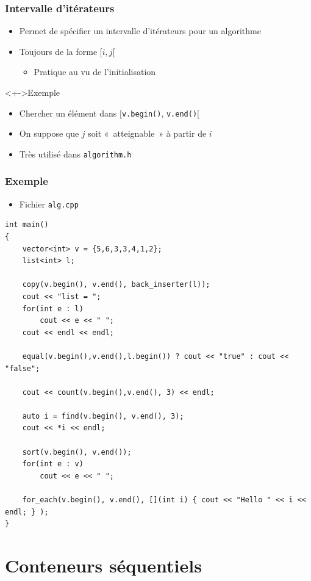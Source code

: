 \begin{frame}
\frametitle{Intervalle d'itérateurs}
\begin{itemize}[<+->]
\item Permet de spécifier un intervalle d'itérateurs pour un algorithme
\item Toujours de la forme $[i,j[$
	\begin{itemize}
	\item Pratique au vu de l'initialisation
	\end{itemize}
\end{itemize}
\begin{exampleblock}<+->{Exemple}
	\begin{itemize}[<+->]
	\item Chercher un élément dans $\big[$\texttt{v.begin()}, \texttt{v.end()}$\big[$
	\end{itemize}
\end{exampleblock}
\begin{itemize}[<+->]
\item On suppose que $j$ soit «~atteignable~» à partir de $i$
\item Très utilisé dans  \texttt{algorithm.h}
\end{itemize}
\end{frame}

\begin{frame}[containsverbatim]
\frametitle{Exemple}
\begin{itemize}
\item Fichier \texttt{alg.cpp}
\end{itemize}
\begin{lstlisting}
int main()
{
	vector<int> v = {5,6,3,3,4,1,2};
	list<int> l;	

	copy(v.begin(), v.end(), back_inserter(l));
	cout << "list = ";
	for(int e : l)
		cout << e << " ";
	cout << endl << endl;

	equal(v.begin(),v.end(),l.begin()) ? cout << "true" : cout << "false";

	cout << count(v.begin(),v.end(), 3) << endl;

	auto i = find(v.begin(), v.end(), 3);
	cout << *i << endl;

	sort(v.begin(), v.end());
	for(int e : v)
		cout << e << " ";

	for_each(v.begin(), v.end(), [](int i) { cout << "Hello " << i << endl; } );
}
\end{lstlisting}
\end{frame}

\section{Conteneurs séquentiels}

